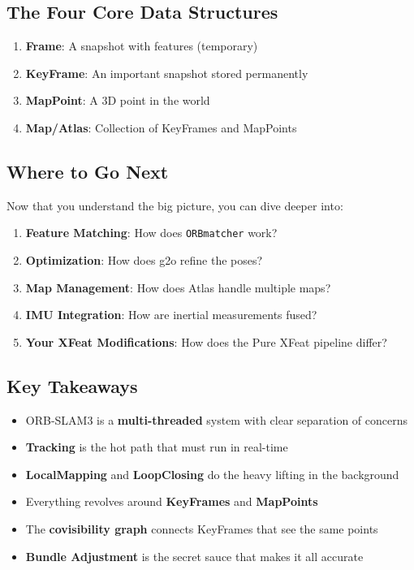 \subsection{The Four Core Data Structures}

\begin{enumerate}
    \item \textbf{Frame}: A snapshot with features (temporary)
    \item \textbf{KeyFrame}: An important snapshot stored permanently
    \item \textbf{MapPoint}: A 3D point in the world
    \item \textbf{Map/Atlas}: Collection of KeyFrames and MapPoints
\end{enumerate}

\subsection{Where to Go Next}

Now that you understand the big picture, you can dive deeper into:

\begin{enumerate}
    \item \textbf{Feature Matching}: How does \texttt{ORBmatcher} work?
    \item \textbf{Optimization}: How does g2o refine the poses?
    \item \textbf{Map Management}: How does Atlas handle multiple maps?
    \item \textbf{IMU Integration}: How are inertial measurements fused?
    \item \textbf{Your XFeat Modifications}: How does the Pure XFeat pipeline differ?
\end{enumerate}

\subsection{Key Takeaways}

\begin{itemize}
    \item ORB-SLAM3 is a \textbf{multi-threaded} system with clear separation of concerns
    \item \textbf{Tracking} is the hot path that must run in real-time
    \item \textbf{LocalMapping} and \textbf{LoopClosing} do the heavy lifting in the background
    \item Everything revolves around \textbf{KeyFrames} and \textbf{MapPoints}
    \item The \textbf{covisibility graph} connects KeyFrames that see the same points
    \item \textbf{Bundle Adjustment} is the secret sauce that makes it all accurate
\end{itemize}
